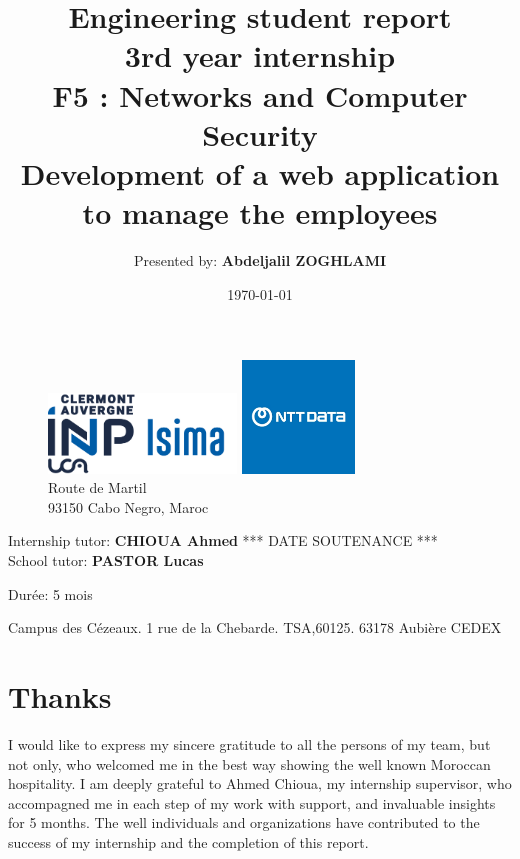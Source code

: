 \documentclass[12pt,a4paper,table,english]{article}
\title{Engineering student report\\
	3rd year internship\\
	F5 : Networks and Computer Security\\
	\textbf{Development of a web application to manage the employees}}
\author{Presented by: \textbf{Abdeljalil ZOGHLAMI}}
\date{\today}
\begin{document}
	\begin{figure}[t]
		\begin{minipage}[t]{0.5\textwidth}
			\centering
			\includegraphics[width=50mm]{Image/Logo_ISIMA_INP.png}
		\end{minipage}%
		\begin{minipage}[t]{0.5\textwidth}
			\centering
			\includegraphics[width=30mm]{Image/Logo_NTT-DATA.png}
			\caption*{Route de Martil\\ 93150 Cabo Negro, Maroc}
		\end{minipage}
	\end{figure}
	
		
	\maketitle
	
	
	\thispagestyle{empty}
	
	\vfill 
	\noindent Internship tutor: \textbf{CHIOUA Ahmed}
	\hfill %
	*** DATE SOUTENANCE *** \\
	\noindent School tutor: \textbf{PASTOR Lucas}
	\begin{flushright}
		Durée: 5 mois
	\end{flushright}
	Campus des Cézeaux. 1 rue de la Chebarde. TSA,60125. 63178 Aubière CEDEX
	
	\newpage
	\section{Thanks}
	

	\vspace{10mm}
	I would like to express my sincere gratitude to all the persons of my team, but not only, who welcomed me in the best way showing the well known Moroccan hospitality. I am deeply grateful to Ahmed Chioua, my internship supervisor, who accompagned me in each step of my work with support, and invaluable insights for 5 months. The well  individuals and organizations have contributed to the success of my internship and the completion of this report.
	
\end{document}
